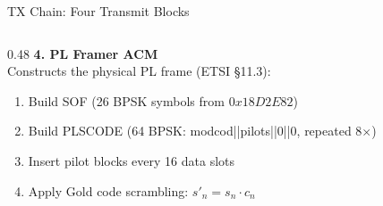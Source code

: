 \documentclass[aspectratio=169,10pt]{beamer}
\begin{document}
\begin{frame}{TX Chain: Four Transmit Blocks}
\begin{columns}[T]
\begin{column}{0.48\textwidth}
      \vspace{0.2em}
      \textbf{4. PL Framer ACM}\\
      \scriptsize Constructs the physical PL frame (ETSI §11.3):
      \begin{enumerate}\scriptsize
        \item Build SOF (26 BPSK symbols from $0x18D2E82$)
        \item Build PLSCODE (64 BPSK: modcod||pilots||0||0, repeated 8$\times$)
        \item Insert pilot blocks every 16 data slots
        \item Apply Gold code scrambling: $s'_n = s_n \cdot c_n$
      \end{enumerate}
    \end{column}
  \end{columns}
\end{frame}
\end{document}
